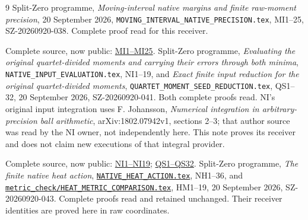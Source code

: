 \documentclass[11pt]{article}
\begin{document}
\begin{thebibliography}{9}
 Split-Zero programme, \emph{Moving-interval native margins
and finite raw-moment precision}, 20 September 2026,
\texttt{MOVING\_INTERVAL\_NATIVE\_PRECISION.tex}, MI1--25,
SZ-20260920-038. Complete proof read for this receiver.

Complete source, now public: \href{https://github.com/KokunoYumeto/zeta-function-research-reader/blob/128aa308dd2a70ba6e073816a957d1ee6414ba2c/workbenches/splitzero-tandem/continuations/20260921-cited-native-input-sources/MOVING_INTERVAL_NATIVE_PRECISION.tex\#L30}{MI1--MI25}.
 Split-Zero programme, \emph{Evaluating the original
quartet-divided moments and carrying their errors through both minima},
\texttt{NATIVE\_INPUT\_EVALUATION.tex}, NI1--19, and
\emph{Exact finite input reduction for the original quartet-divided moments},
\texttt{QUARTET\_MOMENT\_SEED\_REDUCTION.tex}, QS1--32,
20 September 2026, SZ-20260920-041. Both complete proofs read.
NI's original input integration uses F. Johansson,
\emph{Numerical integration in arbitrary-precision ball arithmetic},
arXiv:1802.07942v1, sections 2--3; that author source was read by the
NI owner, not independently here. This note proves its receiver and
does not claim new executions of that integral provider.

Complete source, now public: \href{https://github.com/KokunoYumeto/zeta-function-research-reader/blob/128aa308dd2a70ba6e073816a957d1ee6414ba2c/workbenches/splitzero-tandem/continuations/20260921-cited-native-input-sources/NATIVE_INPUT_EVALUATION.tex\#L32}{NI1--NI19}; \href{https://github.com/KokunoYumeto/zeta-function-research-reader/blob/128aa308dd2a70ba6e073816a957d1ee6414ba2c/workbenches/splitzero-tandem/continuations/20260921-cited-native-input-sources/QUARTET_MOMENT_SEED_REDUCTION.tex\#L27}{QS1--QS32}.
 Split-Zero programme, \emph{The finite native heat action},
\href{https://github.com/KokunoYumeto/zeta-function-research-reader/blob/5992ad50c0f2a06921f1fcaded7b4e38097c0739/workbenches/splitzero-tandem/continuations/20260920-original-kernel-mixed-determinants/providers/NATIVE_HEAT_ACTION.tex\#L1}{\texttt{NATIVE\_HEAT\_ACTION.tex}}, NH1--36, and
\href{https://github.com/KokunoYumeto/zeta-function-research-reader/blob/5992ad50c0f2a06921f1fcaded7b4e38097c0739/workbenches/splitzero-tandem/continuations/20260920-original-kernel-mixed-determinants/providers/HEAT_METRIC_COMPARISON.tex\#L1}{\texttt{metric\_check/HEAT\_METRIC\_COMPARISON.tex}}, HM1--19,
20 September 2026, SZ-20260920-043. Complete proofs read and retained
unchanged. Their receiver identities are proved here in raw coordinates.


\end{thebibliography}
\end{document}
